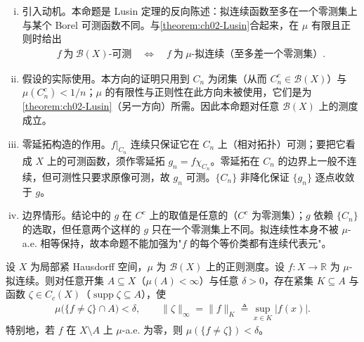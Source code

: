 \documentclass[../../main.tex]{subfiles}%
\begin{document}
\begin{remark}\label{remark:ch02-拟连续可测}
\begin{enumerate}[(i)]
\item 引入动机。本命题是 Lusin 定理的反向陈述：拟连续函数至多在一个零测集上与某个 Borel 可测函数不同。与\cref{theorem:ch02-Lusin}合起来，在 $\mu$ 有限且正则时给出
\begin{align*}
f\ \text{为}\ \mathscr B(X)\text{-可测}\quad\Longleftrightarrow\quad f\ \text{为}\ \mu\text{-拟连续（至多差一个零测集）}.
\end{align*}
\item 假设的实际使用。本方向的证明只用到 $C_n$ 为闭集（从而 $C_n^c\in\mathscr B(X)$）与 $\mu(C_n^c)<1/n$；$\mu$ 的有限性与正则性在此方向未被使用，它们是为\cref{theorem:ch02-Lusin}（另一方向）所需。因此本命题对任意 $\mathscr B(X)$ 上的测度成立。
\item 零延拓构造的作用。$f|_{C_n}$ 连续只保证它在 $C_n$ 上（相对拓扑）可测；要把它看成 $X$ 上的可测函数，须作零延拓 $g_n=f\chi_{C_n}$。零延拓在 $C_n$ 的边界上一般不连续，但可测性只要求原像可测，故 $g_n$ 可测。$\{C_n\}$ 非降化保证 $\{g_n\}$ 逐点收敛于 $g$。
\item 边界情形。结论中的 $g$ 在 $C^c$ 上的取值是任意的（$C^c$ 为零测集）；$g$ 依赖 $\{C_n\}$ 的选取，但任意两个这样的 $g$ 只在一个零测集上不同。拟连续性本身不被 $\mu$-a.e. 相等保持，故本命题不能加强为"$f$ 的每个等价类都有连续代表元"。
\end{enumerate}
\end{remark}

\begin{proposition}\label{proposition:ch02-Tietze逼近}\label{proposition:ch02-连续逼近}
设 $X$ 为局部紧 Hausdorff 空间，$\mu$ 为 $\mathscr B(X)$ 上的正则测度。设 $f:X\to\mathbb{R}$ 为 $\mu$-拟连续。则对任意开集 $A\subseteq X$（$\mu(A)<\infty$）与任意 $\delta>0$，存在紧集 $K\subseteq A$ 与函数 $\zeta\in C_c(X)$（$\operatorname{supp}\zeta\subseteq A$），使
\begin{align*}
\mu\bigl(\{f\neq\zeta\}\cap A\bigr)<\delta,\qquad
\|\zeta\|_\infty=\|f\|_K\triangleq\sup_{x\in K}|f(x)|.
\end{align*}
特别地，若 $f$ 在 $X\setminus A$ 上 $\mu$-a.e. 为零，则 $\mu(\{f\neq\zeta\})<\delta$。
\end{proposition}
\end{document}
